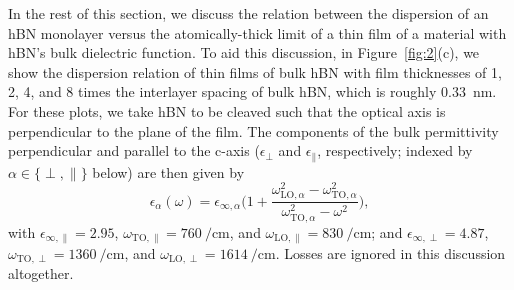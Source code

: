\documentclass[aps,prb,twocolumn,
	           groupedaddress,superscriptaddress,
               amsfonts,amssymb,amsmath,floatfix,
	           citeautoscript]{revtex4-1}
\begin{document}
In the rest of this section, we discuss the relation between the dispersion of an hBN monolayer versus the atomically-thick limit of a thin film of a material with hBN's bulk dielectric function. To aid this discussion, in Figure~\ref{fig:2}(c), we show the dispersion relation of thin films of bulk hBN with film thicknesses of 1, 2, 4, and 8 times the interlayer spacing of bulk hBN, which is roughly \SI{0.33}{\nm}. For these plots, we take hBN to be cleaved such that the optical axis is perpendicular to the plane of the film. The components of the bulk permittivity perpendicular and parallel to the c-axis ($\epsilon_{\perp}$ and $\epsilon_{\parallel}$, respectively; indexed by $\alpha\in\{\perp,\parallel\}$ below) are then given by
\begin{equation}
	\epsilon_{\alpha}(\omega) = \epsilon_{\infty,\alpha}\Bigg(1 + \frac{\omega^2_{\mathrm{LO},\alpha}-\omega^2_{\mathrm{TO},\alpha}}{\omega^2_{\mathrm{TO},\alpha}-\omega^2} \Bigg),
	\label{eq:3deps}
\end{equation}
with $\epsilon_{\infty,\parallel} = \num{2.95}$, $\omega_{\mathrm{TO},\parallel} = \SI{760}{\per\cm}$, and $\omega_{\mathrm{LO},\parallel} = \SI{830}{\per\cm}$; and $\epsilon_{\infty,\perp} = \num{4.87}$, $\omega_{\mathrm{TO},\perp} = \SI{1360}{\per\cm}$, and $\omega_{\mathrm{LO},\perp} = \SI{1614}{\per\cm}$\cite{caldwell2014sub,dai2014tunable}.
Losses are ignored in this discussion altogether. 
\end{document}
